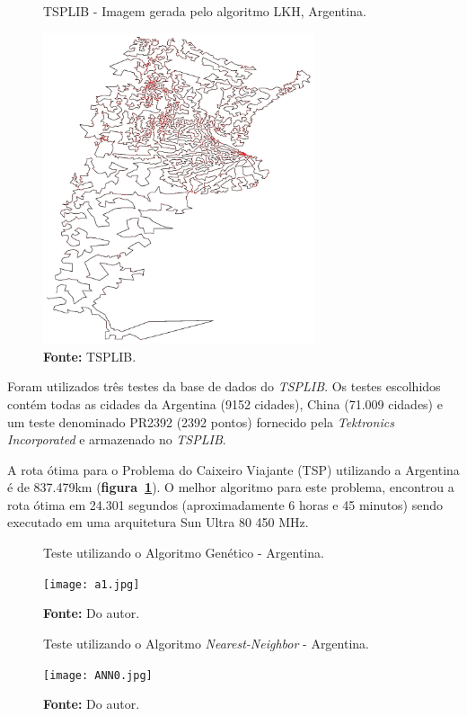 \documentclass[12pt,openright,a4paper,oneside]{tcc}
\begin{document}
        \begin{figure}[h]
            \centering
            \caption{TSPLIB - Imagem gerada pelo algoritmo LKH, Argentina.}
            \includegraphics[width = 8cm,keepaspectratio]{img/artour.jpg}
            \caption*{\textbf{Fonte:} TSPLIB.}
            \label{figargentina}
        \end{figure}

		Foram utilizados três testes da base de dados do \textit{TSPLIB}. Os testes escolhidos contém todas as cidades da Argentina (9152 cidades), China (71.009 cidades) e um teste denominado PR2392 (2392 pontos) fornecido pela \textit{Tektronics Incorporated} e armazenado no \textit{TSPLIB}. 
        
        A rota ótima para o Problema do Caixeiro Viajante (TSP) utilizando a Argentina é de 837.479km (\textbf{figura~\ref{figargentina}}). O melhor algoritmo para este problema, encontrou a rota ótima em 24.301 segundos (aproximadamente 6 horas e 45 minutos) sendo executado em uma arquitetura Sun Ultra 80 450 MHz.
        \newpage
        \begin{figure}[h]
            \centering
            \caption{Teste utilizando o Algoritmo Genético - Argentina.}
            \texttt{[image: a1.jpg]}
            \caption*{\textbf{Fonte:} Do autor.}
            \label{figa1}
        \end{figure}

        \begin{figure}[h]
            \centering
            \caption{Teste utilizando o Algoritmo \textit{Nearest-Neighbor} - Argentina.}
            \texttt{[image: ANN0.jpg]}
            \caption*{\textbf{Fonte:} Do autor.}
            \label{figANN0}
        \end{figure}		
\end{document}

